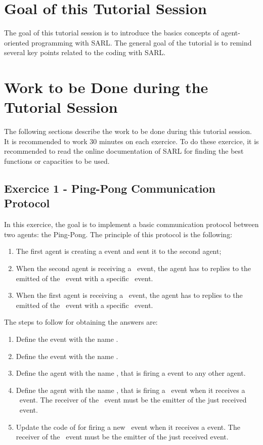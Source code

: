 \documentclass[english,nodocumentinfo,nopubpage]{utbmciadreport}
\begin{document}
\section{Goal of this Tutorial Session}

The goal of this tutorial session is to introduce the basics concepts of agent-oriented programming with SARL.
The general goal of the tutorial is to remind several key points related to the coding with SARL.

\section{Work to be Done during the Tutorial Session}

The following sections describe the work to be done during this tutorial session. It is recommended to work 30 minutes on each exercice.
To do these exercice, it is recommended to read the online documentation of SARL for finding the best functions or capacities to be used.

\subsection{Exercice 1 - Ping-Pong Communication Protocol}

In this exercice, the goal is to implement a basic communication protocol between two agents: the Ping-Pong.
The principle of this protocol is the following:
\begin{enumerate}[1.]
\item The first agent is creating a  event and sent it to the second agent;
\item When the second agent is receiving a \ event, the agent has to replies to the emitted of the \ event with a specific \ event.
\item When the first agent is receiving a \ event, the agent has to replies to the emitted of the \ event with a specific \ event.
\end{enumerate}

The steps to follow for obtaining the answers are:
\begin{enumerate}
\item Define the event with the name .
\item Define the event with the name .
\item Define the agent with the name , that is firing a  event to any other agent.
\item Define the agent with the name , that is firing a \ event when it receives a \ event. The receiver of the \ event must be the emitter of the just received \ event.
\item Update the code of  for firing a new \ event when it receives a  event. The receiver of the \ event must be the emitter of the just received  event.
\end{enumerate}
\end{document}
